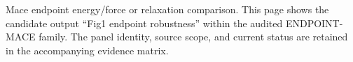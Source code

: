 Mace endpoint energy/force or relaxation comparison. This page shows the candidate output ``Fig1 endpoint robustness'' within the audited ENDPOINT-MACE family. The panel identity, source scope, and current status are retained in the accompanying evidence matrix.
